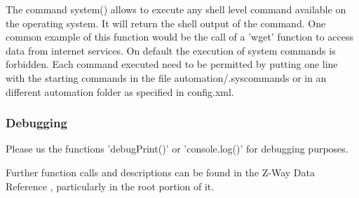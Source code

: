 The command system() allows to execute any shell level command available on the operating system. It will return the shell output of the command. One common example of this function would be the call of a 'wget' function to access data from internet services.
On default the execution of system commands is forbidden. Each command executed need to be permitted by putting one line with the starting commands in the file automation/.syscommands or in an different automation folder as specified in config.xml.
 
\subsubsection{Debugging}

Please us the functions 'debugPrint()' or 'console.log()' for debugging purposes.


Further function calls and descriptions can be found in the  Z-Way Data Reference , particularly in the root portion of it.

